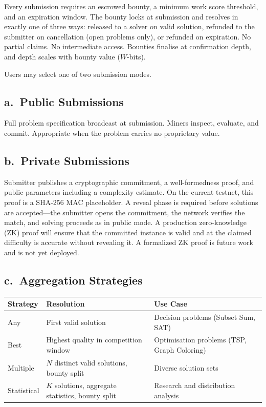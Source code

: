 \documentclass[12pt,letterpaper]{article}
\begin{document}
Every submission requires an escrowed bounty, a minimum work score threshold, and an expiration
window. The bounty locks at submission and resolves in exactly one of three ways: released to a solver
on valid solution, refunded to the submitter on cancellation (open problems only), or refunded on
expiration. No partial claims. No intermediate access. Bounties finalise at confirmation depth, and depth
scales with bounty value ($W$-bits).

Users may select one of two submission modes.

\subsection*{a.\ Public Submissions}

Full problem specification broadcast at submission. Miners inspect, evaluate, and commit. Appropriate
when the problem carries no proprietary value.

\subsection*{b.\ Private Submissions}

Submitter publishes a cryptographic commitment, a well-formedness proof, and public parameters
including a complexity estimate. On the current testnet, this proof is a SHA-256 MAC placeholder.
A reveal phase is required before solutions are accepted---the submitter opens the commitment, the
network verifies the match, and solving proceeds as in public mode. A production zero-knowledge (ZK)
proof will ensure that the committed instance is valid and at the claimed difficulty is accurate without
revealing it. A formalized ZK proof is future work and is not yet deployed.

\subsection*{c.\ Aggregation Strategies}

\begin{center}
\begin{tabular}{L{2.2cm}L{3.8cm}L{4.8cm}}
\toprule
Strategy & Resolution & Use Case \\
\midrule
Any       & First valid solution                          & Decision problems (Subset Sum, SAT) \\
Best      & Highest quality in competition window         & Optimisation problems (TSP, Graph Coloring) \\
Multiple  & $N$ distinct valid solutions, bounty split    & Diverse solution sets \\
Statistical & $K$ solutions, aggregate statistics, bounty split & Research and distribution analysis \\
\bottomrule
\end{tabular}
\end{center}
\end{document}
